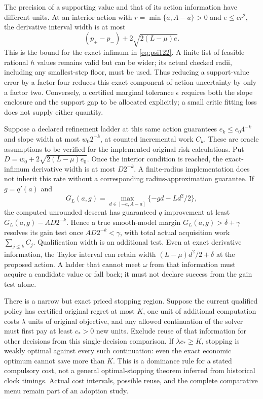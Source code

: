The precision of a supporting value and that of its action information have
different units. At an interior action with
$r=\min\{a,A-a\}>0$ and $e\le cr^2$, the derivative interval width is
at most
\begin{equation}\label{eq:precisionwidth122}
 (p_+-p_-)+2\sqrt{2(L-\mu)e}.
\end{equation}
This is the bound for the exact infimum in \eqref{eq:psi122}.
A finite list of feasible rational $h$ values remains valid but can be wider;
its actual checked radii, including any smallest-step floor, must be used.
Thus reducing a support-value error by a factor four reduces this exact
component of action uncertainty by only a factor two. Conversely, a certified
marginal tolerance $\epsilon$ requires both the slope enclosure and the
support gap to be allocated explicitly; a small critic fitting loss does
not supply either quantity.

Suppose a declared refinement ladder at this same action guarantees
$e_k\le e_0 4^{-k}$ and slope width at most $w_0 2^{-k}$, at counted
incremental work $C_k$. These are oracle assumptions to be verified for
the implemented original-risk calculations. Put
$D=w_0+2\sqrt{2(L-\mu)e_0}$.
Once the interior condition is reached, the exact-infimum derivative
width is at most $D2^{-k}$. A finite-radius implementation does not inherit
this rate without a corresponding radius-approximation guarantee. If $g=q'(a)$ and
\[
 G_L(a,g)=\max_{d\in[-a,A-a]}\{-gd-Ld^2/2\},
\]
the computed unrounded descent has guaranteed $q$ improvement at least
$G_L(a,g)-AD2^{-k}$. Hence a true smooth-model margin
$G_L(a,g)>\delta+\gamma$ resolves its gain test once
$AD2^{-k}<\gamma$, with total actual acquisition work
$\sum_{j\le k}C_j$. Qualification width is an additional test.
Even at exact derivative information, the Taylor interval can retain width
$(L-\mu)d^2/2+\delta$ at the proposed action. A ladder that cannot meet
$\omega$ from that information must acquire a candidate value or fall back;
it must not declare success from the gain test alone.

There is a narrow but exact priced stopping region. Suppose the current
qualified policy has certified original regret at most $K$, one unit of
additional computation costs $\lambda$ units of original objective, and
any allowed continuation of the solver must first pay at least $c_*>0$
new units. Exclude reuse of that information for other decisions from this
single-decision comparison. If $\lambda c_*\ge K$, stopping is weakly
optimal against every such continuation: even the exact economic optimum
cannot save more than $K$. This is a dominance rule for a stated compulsory
cost, not a general optimal-stopping theorem inferred from historical clock
timings. Actual cost intervals, possible reuse, and the complete comparative
menu remain part of an adoption study.
